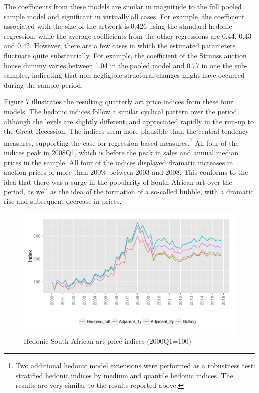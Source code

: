 \documentclass[12pt,]{article}
\let\rmarkdownfootnote\footnote%
\def\footnote{\protect\rmarkdownfootnote}
\begin{document}
The coefficients from these models are similar in magnitude to the full
pooled sample model and significant in virtually all cases. For example,
the coefficient associated with the size of the artwork is 0.426 using
the standard hedonic regression, while the average coefficients from the
other regressions are 0.44, 0.43 and 0.42. However, there are a few
cases in which the estimated parameters fluctuate quite substantially.
For example, the coefficient of the Strauss auction house dummy varies
between 1.04 in the pooled model and 0.77 in one the sub-samples,
indicating that non-negligible structural changes might have occurred
during the sample period.

Figure 7 illustrates the resulting quarterly art price indices from
these four models. The hedonic indices follow a similar cyclical pattern
over the period, although the levels are slightly different, and
appreciated rapidly in the run-up to the Great Recession. The indices
seem more plausible than the central tendency measures, supporting the
case for regression-based measures.\footnote{Two additional hedonic
  model extensions were performed as a robustness test: stratified
  hedonic indices by medium and quantile hedonic indices. The results
  are very similar to the results reported above.} All four of the
indices peak in 2008Q1, which is before the peak in sales and annual
median prices in the sample. All four of the indices displayed dramatic
increases in auction prices of more than 200\% between 2003 and 2008.
This conforms to the idea that there was a surge in the popularity of
South African art over the period, as well as the idea of the formation
of a so-called bubble, with a dramatic rise and subsequent decrease in
prices.

\begin{figure}[htbp]
\centering
\includegraphics{Art_Price_Indices_3_files/figure-latex/figure7-1.pdf}
\caption{Hedonic South African art price indices (2000Q1=100)}
\end{figure}
\end{document}
